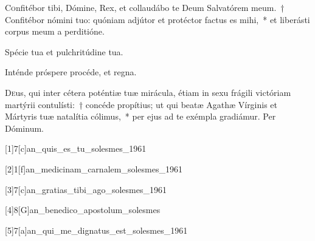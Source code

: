 \documentclass[vesperale_romanum.tex]{subfiles}
\begin{document}
\myrule


\duplex





\lettrine{C}{o}nfitébor tibi, Dómine, Rex, et collaudábo te Deum Salvatórem meum.~† Confitébor nómini tuo: quóniam adjútor et proté\-ctor fa\-ctus es mihi,~* et liberásti corpus meum a perditióne.


\vv Spécie tua et pulchritúdine tua.

\rr Inténde próspere procéde, et regna.

\label{an_stans_beata_agatha_solesmes_1961}


\oratio

\lettrine{D}{e}us, qui inter cétera poténtiæ tuæ mirácula, étiam in sexu frágili vi\-ctóriam martýrii contulísti:~† concéde propítius; ut qui beatæ Agathæ Vírginis et Mártyris tuæ natalítia cólimus,~* per ejus ad te exémpla gradiámur. Per Dóminum.



[1]{7}[c]{an_quis_es_tu_solesmes_1961}

[2]{1}[f]{an_medicinam_carnalem_solesmes_1961} 

[3]{7}[c]{an_gratias_tibi_ago_solesmes_1961}

[4]{8}[G]{an_benedico_apostolum_solesmes}

[5]{7}[a]{an_qui_me_dignatus_est_solesmes_1961}
\end{document}
